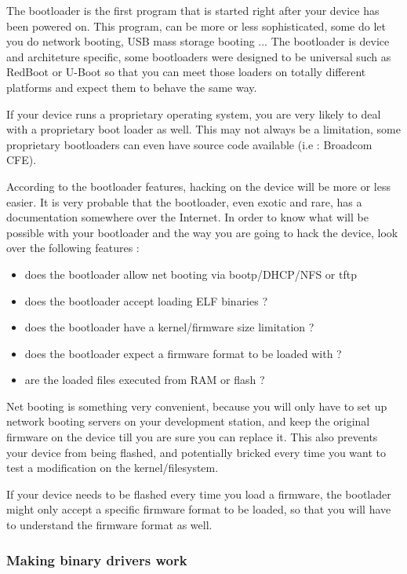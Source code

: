 The bootloader is the first program that is started right after your device has 
been powered on. This program, can be more or less sophisticated, some do let you 
do network booting, USB mass storage booting ... The bootloader is device and 
architeture specific, some bootloaders were designed to be universal such as 
RedBoot or U-Boot so that you can meet those loaders on totally different 
platforms and expect them to behave the same way.

If your device runs a proprietary operating system, you are very likely to deal 
with a proprietary boot loader as well. This may not always be a limitation, 
some proprietary bootloaders can even have source code available (i.e : Broadcom CFE).

According to the bootloader features, hacking on the device will be more or less 
easier. It is very probable that the bootloader, even exotic and rare, has a 
documentation somewhere over the Internet. In order to know what will be possible 
with your bootloader and the way you are going to hack the device, look over the 
following features :

\begin{itemize}
\item does the bootloader allow net booting via bootp/DHCP/NFS or tftp
\item does the bootloader accept loading ELF binaries ?
\item does the bootloader have a kernel/firmware size limitation ?
\item does the bootloader expect a firmware format to be loaded with ?
\item are the loaded files executed from RAM or flash ?
\end{itemize}

Net booting is something very convenient, because you will only have to set up network
booting servers on your development station, and keep the original firmware on the device
till you are sure you can replace it. This also prevents your device from being flashed,
and potentially bricked every time you want to test a modification on the kernel/filesystem.

If your device needs to be flashed every time you load a firmware, the bootlader might
only accept a specific firmware format to be loaded, so that you will have to 
understand the firmware format as well.

\subsubsection{Making binary drivers work}

